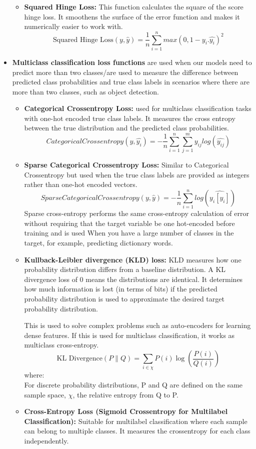 \begin{itemize}
\begin{itemize}
          \item \textbf{Squared Hinge Loss: } This function calculates the square of the score hinge loss. It smoothens the surface of the error function and makes it numerically easier to work with.
          \[
          \text{Squared Hinge Loss}(y,\hat{y})=\frac{1}{n}\sum_{i=1}^{n}max(0,1-y_{i}.\hat{y_{i}})^{2}
          \]
      \end{itemize}
    \item \textbf{Multiclass classification loss functions} are used when our models need to predict more than two classes/are used to measure the difference between predicted class probabilities and true class labels in scenarios where there are more than two classes, such as object detection. \\
          \begin{itemize}
          \item \textbf{Categorical Crossentropy Loss: } used for multiclass classification tasks with one-hot encoded true class labels. It measures the cross entropy between the true distribution and the predicted class probabilities.
          $$Categorical Crossentropy(y,\hat{y_{i}})=-\frac{1}{n}\sum_{i=1}^{n}\sum_{j=1}^{m}y_{ij}log(\hat{y_{ij}})$$
          \item \textbf{Sparse Categorical Crossentropy Loss: } Similar to Categorical Crossentropy but used when the true class labels are provided as integers rather than one-hot encoded vectors.
          $$Sparse Categorical Crossentropy(y,\hat{y})=-\frac{1}{n}\sum_{i=1}^{n}log(\hat{y_{i}[y_{i}]})$$
          Sparse cross-entropy performs the same cross-entropy calculation of error without requiring that the target variable be one hot-encoded before training and is used When you have a large number of classes in the target, for example, predicting dictionary words.
          \item \textbf{Kullback-Leibler divergence (KLD) loss: } KLD measures how one probability distribution differs from a baseline distribution. A KL divergence loss of 0 means the distributions are identical. It determines how much information is lost (in terms of bits) if the predicted probability distribution is used to approximate the desired target probability distribution.

        This is used to solve complex problems such as auto-encoders for learning dense features. If this is used for multiclass classification, it works as multiclass cross-entropy.
        \[
        \text{KL Divergence}(P \parallel Q) = \sum_{i \in \chi} P(i) \log\left(\frac{P(i)}{Q(i)}\right)
        \]
        where:\\
        For discrete probability distributions, P and Q are defined on the same sample space, $\chi$, the relative entropy from Q to P.
        \item \textbf{Cross-Entropy Loss (Sigmoid Crossentropy for Multilabel Classification): }
        Suitable for multilabel classification where each sample can belong to multiple classes. It measures the crossentropy for each class independently.


\end{itemize}
\end{itemize}
